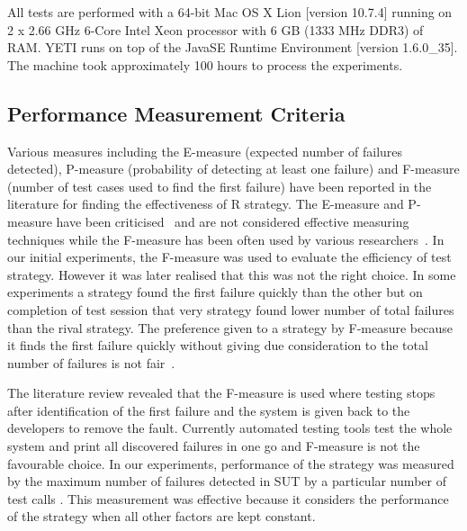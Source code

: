 All tests are performed with a 64-bit Mac OS X Lion [version 10.7.4] running on 2 x 2.66 GHz 6-Core Intel Xeon processor with 6 GB (1333 MHz DDR3) of RAM. YETI runs on top of the Java\texttrademark  SE Runtime Environment [version 1.6.0\_35]. The machine took approximately 100 hours to process the experiments.


\subsection{Performance Measurement Criteria} \label{measurementCriteria_4}
Various measures including the E-measure (expected number of failures detected), P-measure (probability of detecting at least one failure) and F-measure (number of test cases used to find the first failure) have been reported in the literature for finding the effectiveness of R strategy. The E-measure and P-measure have been criticised~\cite{chen2005adaptive} and are not considered effective measuring techniques while the F-measure has been often used by various researchers~\cite{chen2004statistical, chen1996expected}. In our initial experiments, the F-measure was used to evaluate the efficiency of test strategy. However it was later realised that this was not the right choice. In some experiments a strategy found the first failure quickly than the other but on completion of test session that very strategy found lower number of total failures than the rival strategy. The preference given to a strategy by F-measure because it finds the first failure quickly without giving due consideration to the total number of failures is not fair~\cite{liu2012comparison}.


  
The literature review revealed that the F-measure is used where testing stops after identification of the first failure and the system is given back to the developers to remove the fault. Currently automated testing tools test the whole system and print all discovered failures in one go and F-measure is not the favourable choice. In our experiments, performance of the strategy was measured by the maximum number of failures detected in SUT by a particular number of test calls \cite{ciupa2007experimental, pacheco2007feedback, ciupa2008predictability}. This measurement was effective because it considers the performance of the strategy when all other factors are kept constant.




